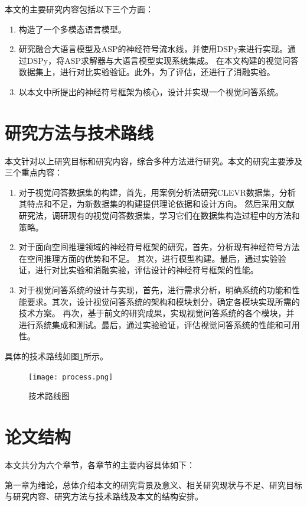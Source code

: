 本文的主要研究内容包括以下三个方面：

\begin{enumerate}[label=(\arabic*),itemsep=0pt,parsep=0pt]
    \item 构造了一个多模态语言模型。
    \item 研究融合大语言模型及ASP的神经符号流水线，并使用DSPy来进行实现。通过DSPy，将ASP求解器与大语言模型实现系统集成。
在本文构建的视觉问答数据集上，进行对比实验验证。此外，为了评估，还进行了消融实验。
    \item 以本文中所提出的神经符号框架为核心，设计并实现一个视觉问答系统。
\end{enumerate}

\section{研究方法与技术路线}
本文针对以上研究目标和研究内容，综合多种方法进行研究。本文的研究主要涉及三个重点内容：
\begin{enumerate}[label=(\arabic*),itemsep=0pt,parsep=0pt]
    \item 对于视觉问答数据集的构建，首先，用案例分析法研究CLEVR数据集，分析其特点和不足，为新数据集的构建提供理论依据和设计方向。
然后采用文献研究法，调研现有的视觉问答数据集，学习它们在数据集构造过程中的方法和策略。
    \item 对于面向空间推理领域的神经符号框架的研究，首先，分析现有神经符号方法在空间推理方面的优势和不足。
其次，进行模型构建。最后，通过实验验证，进行对比实验和消融实验，评估设计的神经符号框架的性能。
    \item 对于视觉问答系统的设计与实现，首先，进行需求分析，明确系统的功能和性能要求。其次，设计视觉问答系统的架构和模块划分，确定各模块实现所需的技术方案。
再次，基于前文的研究成果，实现视觉问答系统的各个模块，并进行系统集成和测试。最后，通过实验验证，评估视觉问答系统的性能和可用性。
\end{enumerate}

具体的技术路线如图\ref{roadmap}所示。

\begin{figure}
    \centering
    \texttt{[image: process.png]}
    \caption{技术路线图\label{roadmap}}
\end{figure}

\section{论文结构}
本文共分为六个章节，各章节的主要内容具体如下：

第一章为绪论，总体介绍本文的研究背景及意义、相关研究现状与不足、研究目标
与研究内容、研究方法与技术路线及本文的结构安排。

